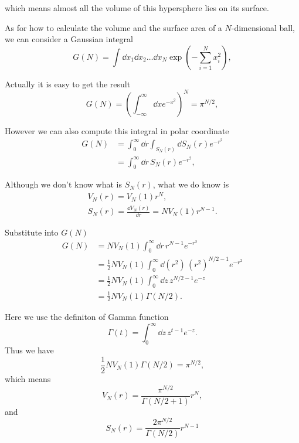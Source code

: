 \documentclass[10pt]{article}
\begin{document}
which means almost all the volume of this hypersphere lies on its surface.

As for how to calculate the volume and the surface area of a $N$-dimensional ball, we can consider a Gaussian integral
\begin{equation}
	G(N) = \int \dd x_1 \dd x_2 \dots \dd x_N \exp\left(-\sum_{i=1}^{N} x_i^2\right),
\end{equation}

Actually it is easy to get the result
\begin{equation}
	G(N) = \left(\int_{-\infty}^{\infty} \dd x e^{-x^2}\right)^N = \pi^{N/2},
\end{equation}

However we can also compute this integral in polar coordinate
\begin{align*}
G(N) &= \int_0^{\infty} \dd r \int_{S_N(r)} \dd S_N(r) e^{-r^2} \\
&= \int_0^{\infty} \dd r \, S_N(r) e^{-r^2},
\end{align*}

Although we don't know what is $S_N(r)$, what we do know is
\begin{gather}
	V_N(r) = V_N(1)r^N, \\
	S_N(r) = \frac{\dd V_N(r)}{\dd r} = NV_N(1)r^{N-1}.
\end{gather}

Substitute into $G(N)$
\begin{align*}
	G(N) &= NV_N(1) \int_0^{\infty} \dd r \, r^{N-1} e^{-r^2} \\
	&= \frac{1}{2}NV_N(1) \int_0^{\infty} \dd (r^2) \, (r^2)^{N/2-1} e^{-r^2} \\
	&= \frac{1}{2}NV_N(1) \int_0^{\infty} \dd z \, z^{N/2-1} e^{-z} \\
	&= \frac{1}{2}NV_N(1) \Gamma(N/2).
\end{align*}

Here we use the definiton of Gamma function
\begin{equation}
	\Gamma(t) = \int_0^{\infty} \dd z \, z^{t-1}e^{-z}.
\end{equation}
Thus we have
\begin{equation}
	\frac{1}{2}NV_N(1) \Gamma(N/2) = \pi^{N/2},
\end{equation}
which means
\begin{equation}
	V_N(r) = \frac{\pi^{N/2}}{\Gamma(N/2 +1)}r^N,
\end{equation}
and
\begin{equation}
	S_N(r) = \frac{2\pi^{N/2}}{\Gamma(N/2)}r^{N-1}
\end{equation}
\end{document}
